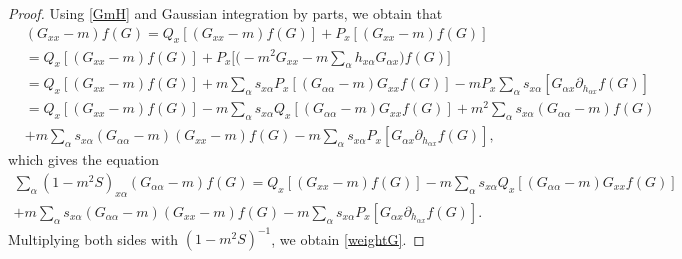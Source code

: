 \documentclass{article}
\newcommand{\1}{\mathds{1}}
\numberwithin{equation}{section}
\newcommand{\al}{\alpha}
\theoremstyle{plain} %
\theoremstyle{remark}
\begin{document}
\begin{proof}
Using \eqref{GmH} and Gaussian integration by parts, we obtain that
\begin{align*}
& (G_{xx}  -  m) f(G) =Q_x \left[(G_{xx}  -  m) f(G)\right] + P_x \left[(G_{xx}  -  m) f(G)\right] \\
&=Q_x \left[(G_{xx}  -  m) f(G)\right] +  P_x \Big[ \Big( -m^2G_{xx} - m \sum_\al h_{x\al}G_{\al x}\Big) f(G)\Big]\\
  &=Q_x\left[ (G_{xx}  -  m) f(G) \right] + m \sum_{\al} s_{x\al}P_x\left[ (G_{\al\al}-m) G_{xx}f(G) \right]-  m P_x  \sum_\al s_{x\al} \left[ G_{\al x}\partial_{ h_{\al x}} f(G)\right]\\
  &=Q_x\left[ (G_{xx}  -  m) f(G) \right] - m \sum_{\al} s_{x\al}Q_x\left[ (G_{\al\al}-m) G_{xx}f(G) \right] + m^2 \sum_{\al} s_{x\al} (G_{\al\al}-m)  f(G) \\
  &+ m \sum_{\al} s_{x\al} (G_{\al\al}-m) (G_{xx}-m)f(G)-  m \sum_\al s_{x\al} P_x  \left[  G_{\al x}\partial_{  h_{\al x}} f(G)\right],
  \end{align*}
which gives the equation
\begin{align*}
 \sum_\al(1-m^2 S)_{x\al}(G_{\al\al}  -  m) f(G) =Q_x\left[ (G_{xx}  -  m) f(G) \right] - m \sum_{\al} s_{x\al}Q_x\left[ (G_{\al\al}-m) G_{xx}f(G) \right]  \\
 + m \sum_{\al} s_{x\al} (G_{\al\al}-m) (G_{xx}-m)f(G)-  m \sum_\al s_{x\al} P_x  \left[  G_{\al x}\partial_{  h_{\al x}} f(G)\right].
\end{align*}
Multiplying both sides with $(1-m^2 S)^{-1}$, we obtain \eqref{weightG}.  
\end{proof}
\end{document}
